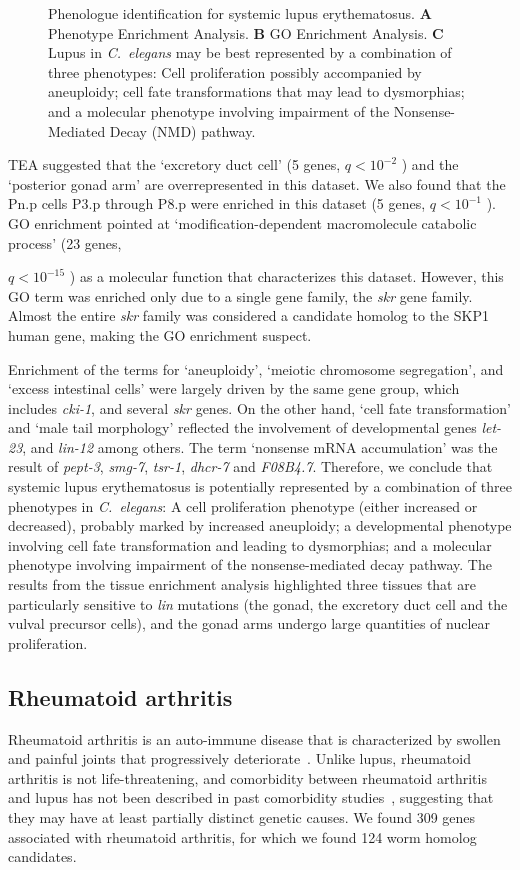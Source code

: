 \documentclass[10pt,letterpaper,twocolumn]{article}
\newcommand{\cel}{\emph{C.~elegans}}
\newcommand{\harthritis}{309}
\newcommand{\warthritis}{124}
\newcommand{\qval}[1]{
                      \ensuremath{
                                  q<10^{-#1}
                                  }
                      }
\begin{document}
\begin{figure}[htbp]
  \caption{Phenologue identification for systemic lupus erythematosus.
           \textbf{A} Phenotype Enrichment Analysis. \textbf{B} GO Enrichment
           Analysis. \textbf{C} Lupus in \cel{} may be best represented by
           a combination of three phenotypes: Cell proliferation possibly
           accompanied by aneuploidy; cell fate transformations that may lead
           to dysmorphias; and a molecular phenotype involving impairment of
           the Nonsense-Mediated Decay (NMD) pathway.}
\label{fig:lupus}
\end{figure}

TEA suggested that the
`excretory duct cell' (5 genes, \qval{2}) and the `posterior gonad arm' are
overrepresented in this dataset. We also found that the Pn.p cells P3.p through
P8.p were enriched in this dataset (5 genes, \qval{1}). GO enrichment pointed
at `modification-dependent macromolecule catabolic process' (23 genes,
\qval{15}) as a molecular function that characterizes this dataset. However,
this GO term was enriched only due to a single gene family, the \emph{skr} gene
family. Almost the entire \emph{skr} family was considered a candidate homolog
to the SKP1 human gene, making the GO enrichment suspect.

Enrichment of the terms for `aneuploidy', `meiotic chromosome segregation',
and `excess intestinal cells' were largely driven by the same gene group, which
includes \emph{cki-1}, and several \emph{skr} genes. On the other hand, `cell
fate transformation' and `male tail morphology' reflected the involvement of
developmental genes \emph{let-23}, and \emph{lin-12} among others. The term
`nonsense mRNA accumulation' was the result of \emph{pept-3}, \emph{smg-7},
\emph{tsr-1}, \emph{dhcr-7} and \emph{F08B4.7}. Therefore, we conclude that
systemic lupus erythematosus is potentially represented by a combination of three
phenotypes in \cel{}: A cell proliferation phenotype (either increased or
decreased), probably marked by increased
aneuploidy; a developmental phenotype involving cell fate transformation and
leading to dysmorphias; and a molecular phenotype involving impairment of the
nonsense-mediated decay pathway.
The results from the tissue enrichment analysis
highlighted three tissues that are particularly sensitive to \emph{lin} mutations
(the gonad, the excretory duct cell and the vulval precursor cells),
and the gonad arms undergo large quantities of nuclear proliferation.

\subsection*{Rheumatoid arthritis}
Rheumatoid arthritis is an auto-immune disease that is characterized by
swollen and painful joints that progressively deteriorate~\cite{Smolen2016}. Unlike lupus,
rheumatoid arthritis is not life-threatening, and comorbidity between rheumatoid
arthritis and lupus has not been described in past comorbidity studies~\cite{Dougados2013},
suggesting that they may have at least
partially distinct genetic causes. We found \harthritis{} genes associated with
rheumatoid arthritis, for which we found \warthritis{} worm homolog candidates.
\end{document}
